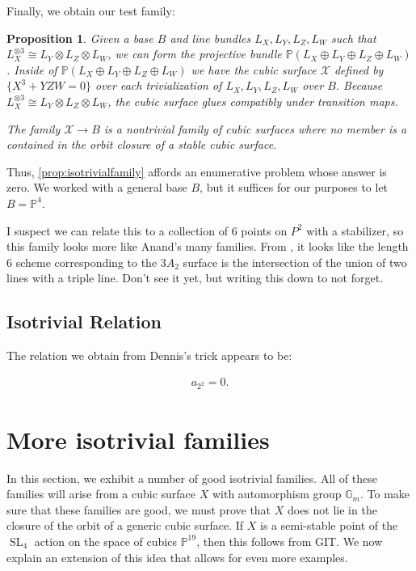 \documentclass[12 pt]{amsart}
\newtheorem{proposition}{Proposition}[section]
\renewcommand{\P}{\mathbb{P}}
\newcommand{\SL}{\operatorname{SL}}
\newcommand{\<}{\left\langle}
\renewcommand{\>}{\right\rangle}
\begin{document}
Finally, we obtain our test family:
\begin{proposition}
\label{prop:isotrivialfamily}
Given a base $B$ and line bundles $L_X, L_Y, L_Z, L_W$ such that $L_X^{\otimes 3}\cong L_Y\otimes L_Z\otimes L_W$, we can form the projective bundle $\mathbb{P}(L_X\oplus L_Y\oplus L_Z\oplus L_W)$. Inside of $\mathbb{P}(L_X\oplus L_Y\oplus L_Z\oplus L_W)$ we have the cubic surface $\mathcal{X}$ defined by $\{X^3 + YZW = 0\}$ over each trivialization of $L_X, L_Y, L_Z, L_W$ over $B$. Because $L_X^{\otimes 3}\cong L_Y\otimes L_Z\otimes L_W$, the cubic surface glues compatibly under transition maps.

The family $\mathcal{X}\to B$ is a nontrivial family of cubic surfaces where no member is a contained in the orbit closure of a stable cubic surface.
\end{proposition}

Thus, \autoref{prop:isotrivialfamily} affords an enumerative problem whose answer is zero. We worked with a general base $B$, but it suffices for our purposes to let $B=\mathbb{P}^4$. 

{\color{red} I suspect we can relate this to a collection of 6 points on $P^2$ with a stabilizer, so this family looks more like Anand's many families. From \cite[Proposition 3.3]{N05}, it looks like the length 6 scheme corresponding to the $3A_2$ surface is the intersection of the union of two lines with a triple line. Don't see it yet, but writing this down to not forget.}

\subsection{Isotrivial Relation}
\label{sec:isotrivial-relation}

The relation we obtain from Dennis's trick appears to be:

\begin{align}
  \label{eq:relationDennis}
  a_{2^{2}} = 0.
\end{align}

\section{More isotrivial families}
In this section, we exhibit a number of good isotrivial families.
All of these families will arise from a cubic surface $X$ with automorphism group $\mathbb G_m$.
To make sure that these families are good, we must prove that $X$ does not lie in the closure of the orbit of a generic cubic surface.
If $X$ is a semi-stable point of the $\SL_4$ action on the space of cubics $\P^{19}$, then this follows from GIT.
We now explain an extension of this idea that allows for even more examples.
\end{document}
